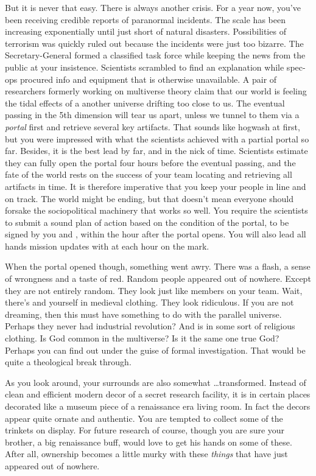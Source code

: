 \documentclass[char]{guildcamp3}
\begin{document}
But it is never that easy. There is always another crisis. For a year now, you've been receiving credible reports of paranormal incidents. The scale has been increasing exponentially until just short of natural disasters. Possibilities of terrorism was quickly ruled out because the incidents were just too bizarre. The Secretary-General formed a classified task force while keeping the news from the public at your insistence. Scientists scrambled to find an explanation while spec-ops procured info and equipment that is otherwise unavailable. A pair of researchers formerly working on multiverse theory claim that our world is feeling the tidal effects of a another universe drifting too close to us. The eventual passing in the 5th dimension will tear us apart, unless we tunnel to them via a \emph{portal} first and retrieve several key artifacts. That sounds like hogwash at first, but you were impressed with what the scientists achieved with a partial portal so far. Besides, it is the best lead by far, and in the nick of time. Scientists estimate they can fully open the portal four hours before the eventual passing, and the fate of the world rests on the success of your team locating and retrieving all artifacts in time. It is therefore imperative that you keep your people in line and on track. The world might be ending, but that doesn't mean everyone should forsake the sociopolitical machinery that works so well. You require the scientists to submit a sound plan of action based on the condition of the portal, to be signed by you and \cPoliTwo{}, within the hour after the portal opens. You will also lead all hands mission updates with \cPoliTwo{} at each hour on the mark. 

When the portal opened though, something went awry. There was a flash, a sense of wrongness and a taste of red. Random people appeared out of nowhere. Except they are not entirely random. They look just like members on your team. Wait, there's \cPoliTwo{} and yourself in medieval clothing. They look ridiculous. If you are not dreaming, then this must have something to do with the parallel universe. Perhaps they never had industrial revolution? And \cTech{} is in some sort of religious clothing. Is God common in the multiverse? Is it the same one true God? Perhaps you can find out under the guise of formal investigation. That would be quite a theological break through.

As you look around, your surrounds are also somewhat \ldots transformed. Instead of clean and efficient modern decor of a secret research facility, it is in certain places decorated like a museum piece of a renaissance era living room. In fact the decors appear quite ornate and authentic. You are tempted to collect some of the trinkets on display. For future research of course, though you are sure your brother, a big renaissance buff, would love to get his hands on some of these. After all, ownership becomes a little murky with these \emph{things} that have just appeared out of nowhere.
\end{document}
